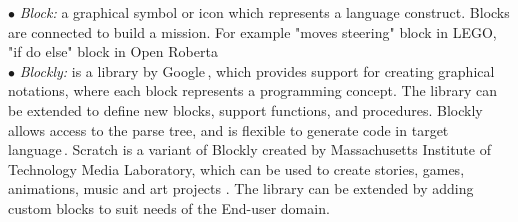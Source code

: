 $\bullet$ \emph{Block:} a graphical symbol or icon  which represents  a language construct.  Blocks are connected to build a mission. For example "moves steering" block in LEGO, "if do else" block in Open Roberta ~\cite{OpenRoberta}\\ %

$\bullet$ \emph{Blockly:} is a library by Google\,\cite{blockly}, which provides support for creating graphical notations, where each block represents a programming concept. %
The library can be extended to define new blocks, support functions, and procedures. Blockly allows access to the parse tree, and is flexible to generate code in target language\,\cite{Passault2016}. Scratch is a variant of Blockly created by Massachusetts Institute of Technology Media Laboratory, which can be used to create stories, games, animations, music and art projects \cite{Kaucic2015}. The library can be extended by adding custom blocks to suit needs of the End-user domain. %

